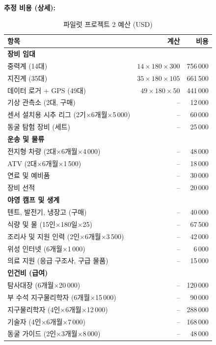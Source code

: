 \documentclass[12pt,a4paper]{article}
\theoremstyle{remark}
\begin{document}
	\textbf{추정 비용 (상세):}
	\begin{table}[htbp]
		\centering
		\caption{파일럿 프로젝트 2 예산 (USD)}
		\label{tab:budget-karst}
		\small
		\begin{tabular}{lrr}
			\toprule
			\textbf{항목} & \textbf{계산} & \textbf{비용} \\
			\midrule
			\multicolumn{3}{l}{\textbf{장비 임대}} \\
			중력계 (14대) & $14\times180\times300$ & 756\,000 \\
			지진계 (35대) & $35\times180\times105$ & 661\,500 \\
			데이터 로거 + GPS (49대) & $49\times180\times50$ & 441\,000 \\
			기상 관측소 (2대, 구매) & – & 12\,000 \\
			센서 설치용 시추 리그 (2기$\times$6개월$\times$5\,000) & – & 60\,000 \\
			동굴 탐험 장비 (세트) & – & 25\,000 \\
			\multicolumn{3}{l}{\textbf{운송 및 물류}} \\
			전지형 차량 (2대$\times$6개월$\times$4\,000) & – & 48\,000 \\
			ATV (2대$\times$6개월$\times$1\,500) & – & 18\,000 \\
			연료 및 예비품 & – & 30\,000 \\
			장비 선적 & – & 20\,000 \\
			\multicolumn{3}{l}{\textbf{야영 캠프 및 생계}} \\
			텐트, 발전기, 냉장고 (구매) & – & 40\,000 \\
			식량 및 물 (15인$\times$180일$\times$25) & – & 67\,500 \\
			조리사 및 지원 인력 (2인$\times$6개월$\times$3\,500) & – & 42\,000 \\
			위성 인터넷 (6개월$\times$1\,000) & – & 6\,000 \\
			의료 지원 (응급 구조사, 구급 물품) & – & 15\,000 \\
			\multicolumn{3}{l}{\textbf{인건비 (급여)}} \\
			탐사대장 (6개월$\times$20\,000) & – & 120\,000 \\
			부 수석 지구물리학자 (6개월$\times$15\,000) & – & 90\,000 \\
			지구물리학자 (4인$\times$6개월$\times$12\,000) & – & 288\,000 \\
			기술자 (4인$\times$6개월$\times$7\,000) & – & 168\,000 \\
			동굴 가이드 (2인$\times$3개월$\times$8\,000) & – & 48\,000 \\

\end{tabular}
\end{table}
\end{document}
